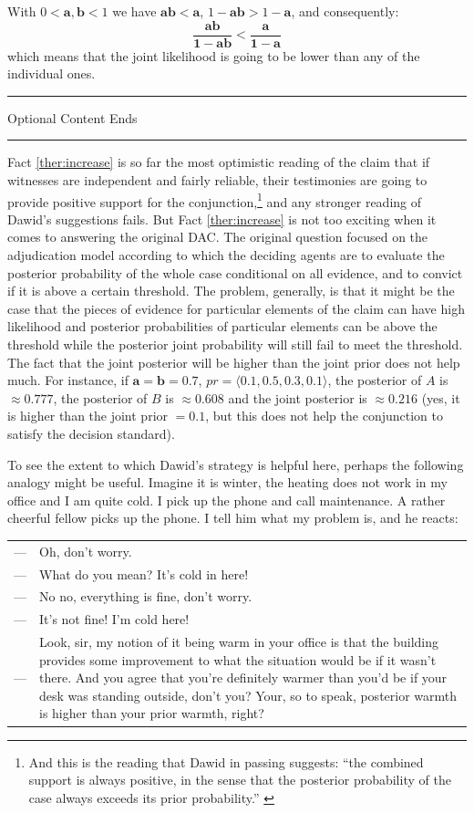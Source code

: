\documentclass{ifcolog}
\newcommand{\intermezzob}{\nopagebreak 
	\begin{minipage}[c]{13cm}
	\begin{center}\rule{10cm}{0.4pt}

	\tiny{\sc Optional Content Ends}
	
	\vspace{-1mm}
	
	\rule{10cm}{0.4pt}\end{center}
	\end{minipage}
	}
\newcommand{\la}{\langle}
\newcommand{\ra}{\rangle}
\begin{document}
 With $0<\mathbf{a},\mathbf{b}<1$ we have $\mathbf{ab}<\mathbf{a}$, $1-\mathbf{ab}>1-\mathbf{a}$, and consequently:
 \[\frac{\mathbf{ab}}{\mathbf{1-ab}} < \frac{\mathbf{a}}{\mathbf{1-a}}\]
 which means that the joint likelihood is going to be lower than any of the individual ones.




\intermezzob



  Fact \ref{ther:increase} is so far the most optimistic reading of the claim that if witnesses are independent and fairly reliable, their testimonies are going to provide positive support for the conjunction,\footnote{And this is the reading that Dawid in passing suggests: ``the combined support is always positive, in the sense that the posterior probability of the case always exceeds its prior probability.'' \citep[95]{dawid1987difficulty}} and any stronger reading of Dawid's suggestions fails. But Fact \ref{ther:increase} is not too exciting when it comes to answering the original DAC. The original question focused on the adjudication model according to which the deciding agents are to evaluate the posterior probability of the whole case conditional on all evidence, and to convict if it is above a certain threshold. The problem, generally, is that  it might be the case that  the pieces of evidence for particular elements of the claim can have high likelihood and posterior probabilities of particular elements can be above the threshold while the posterior joint probability will still fail to meet the threshold. The fact that the joint posterior will be higher than the joint prior does not  help much. For instance, if $\mathbf{a}=\mathbf{b}=0.7$, $pr=\la 0.1, 0.5, 0.3, 0.1\ra$, the posterior of $A$ is $\approx 0.777$, the posterior of $B$ is $\approx 0.608$ and the joint posterior is $\approx 0.216$ (yes, it is  higher than the joint prior $=0.1$, but this does not help the conjunction to satisfy the decision standard).




 To see the extent to which Dawid's strategy is helpful here, perhaps the following analogy might be useful.  
 Imagine it is winter, the heating does not work in my office and I am quite cold. I pick up the phone and call maintenance. A rather cheerful fellow picks up the phone. I tell him what my problem is, and he reacts:

 \vspace{1mm}
 \begin{tabular}{lp{10cm}}
 --- & Oh, don't worry. \\
 --- & What do you mean? It's cold in here! \\
 --- & No no, everything is fine, don't worry.\\
 --- & It's not fine! I'm cold here! \\
 --- & Look, sir, my notion of it being warm in your office is that the building provides some improvement to what the situation would be if it wasn't there. And you agree that you're definitely warmer than you'd be if your desk was standing outside, don't you? Your, so to speak, posterior warmth is higher than your prior warmth, right? 
 \end{tabular}
 \vspace{1mm}
\end{document}

